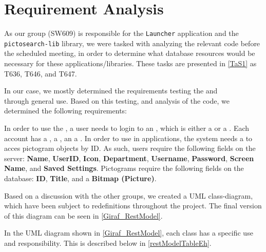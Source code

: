 \section{Requirement Analysis}
As our group (SW609) is responsible for the \texttt{Launcher} application and
the \\\texttt{pictosearch-lib} library, we were tasked with analyzing the
relevant code before the scheduled meeting, in order to determine what database resources
would be necessary for these applications/libraries. These tasks are presented
in \autoref{TaS1} as T636, T646, and T647.\nl

In our case, we mostly determined the requirements testing the 
and\\  through general use. Based on this testing, and
analysis of the code, we determined the following requirements:\nl

In order to use the , a user needs to login to an
, which is either a  or a . Each
account has a , a , an a .
In order to use  in applications, the system needs a to acces
pictogram objects by ID. As such, users require the following fields on the
server: \textbf{Name}, \textbf{UserID}, \textbf{Icon}, \textbf{Department},
\textbf{Username}, \textbf{Password}, \textbf{Screen Name}, and \textbf{Saved
Settings}.
Pictograms require the following fields on the database: \textbf{ID},
\textbf{Title}, and a \textbf{Bitmap (Picture)}.\nl

Based on a discussion with the other groups, we created a UML class-diagram,
which have been subject to redefinitions throughout the project. The final
version of this diagram can be seen in \autoref{Giraf_RestModel}.


In the UML diagram shown in \autoref{Giraf_RestModel}, each class has a
specific use and responsibility. This is described below in
\autoref{restModelTableEh}.

